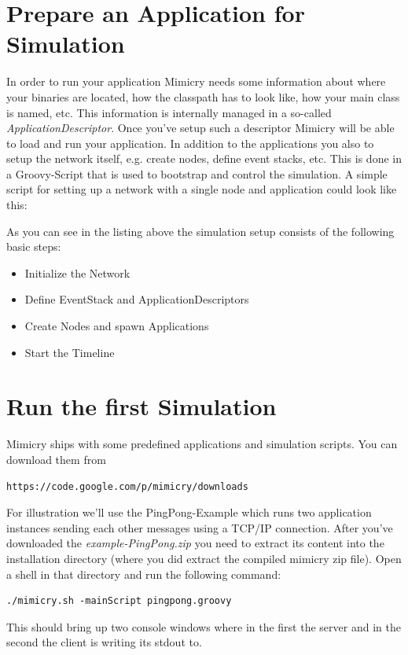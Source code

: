 \documentclass[a4paper,oneside]{book}
\begin{document}
\section{Prepare an Application for Simulation}
In order to run your application Mimicry needs some information about where your binaries are located, how the classpath has to look like, how your main class is named, etc. This information is internally managed in a so-called \textit{ApplicationDescriptor}. Once you've setup such a descriptor Mimicry will be able to load and run your application.
In addition to the applications you also to setup the network itself, e.g. create nodes, define event stacks, etc. This is done in a Groovy-Script that is used to bootstrap and control the simulation.
A simple script for setting up a network with a single node and application could look like this:



As you can see in the listing above the simulation setup consists of the following basic steps:
\begin{itemize}
\item Initialize the Network
\item Define EventStack and ApplicationDescriptors
\item Create Nodes and spawn Applications
\item Start the Timeline
\end{itemize}


\section{Run the first Simulation}
Mimicry ships with some predefined applications and simulation scripts. You can download them from
\begin{verbatim}
https://code.google.com/p/mimicry/downloads
\end{verbatim}
For illustration we'll use the PingPong-Example which runs two application instances sending each other messages using a TCP/IP connection.
After you've downloaded the \textit{example-PingPong.zip} you need to extract its content into the installation directory (where you did extract the compiled mimicry zip file).
Open a shell in that directory and run the following command:
\begin{verbatim}
./mimicry.sh -mainScript pingpong.groovy
\end{verbatim}
This should bring up two console windows where in the first the server and in the second the client is writing its stdout to.
\end{document}
